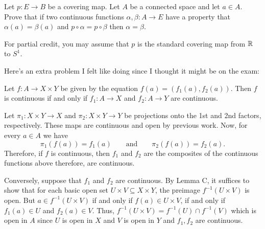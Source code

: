 \begin{problem}
  Let \(p\colon E\to B\) be a covering map. Let \(A\) be a connected space
  and let \(a\in A\). Prove that if two continuous functions
  \(\alpha,\beta\colon A\to E\) have a property that \(\alpha(a)=\beta(a)\)
  and \(p\circ\alpha=p\circ\beta\) then \(\alpha=\beta\).

  For partial credit, you may assume that \(p\) is the standard covering
  map from \(\mathbb{R}\) to \(S^1\).
\end{problem}
\begin{solution}
\end{solution}

Here's an extra problem I felt like doing since I thought it might be on
the exam:
\begin{problem*}
  \begin{theorem*}
    Let \(f\colon A\to X\times Y\) be given by the equation
    \(f(a)=(f_1(a),f_2(a))\). Then \(f\) is continuous if and only if
    \(f_1\colon A\to X\) and \(f_2\colon A\to Y\) are continuous.
  \end{theorem*}
\end{problem*}
\begin{solution}
  Let \(\pi_1\colon X\times Y\to X\) and \(\pi_2\colon X\times Y\to Y\) be
  projections onto the 1st and 2nd factors, respectively. These maps are
  continuous and open by previous work. Now, for every \(a\in A\) we have
  \[
    \pi_1(f(a))=f_1(a)\qquad\text{and}\qquad \pi_2(f(a))=f_2(a).
  \]
  Therefore, if \(f\) is continuous, then \(f_1\) and \(f_2\) are the
  composites of the continuous functions above therefore, are continuous.

  Conversely, suppose that \(f_1\) and \(f_2\) are continuous. By Lemma C,
  it suffices to show that for each basic open set
  \(U\times V\subseteq X\times Y\), the preimage \(f^{-1}(U\times V)\) is
  open. But \(a\in f^{-1}(U\times V)\) if and only if
  \(f(a)\in U\times V\), if and only if \(f_1(a)\in U\) and
  \(f_2(a)\in V\). Thus, \(f^{-1}(U\times V)=f^{-1}(U)\cap f^{-1}(V)\)
  which is open in \(A\) since \(U\) is open in \(X\) and \(V\) is open in
  \(Y\) and \(f_1,f_2\) are continuous.
\end{solution}

